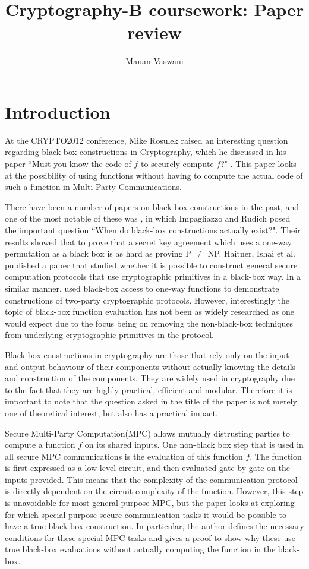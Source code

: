 \documentclass[11pt]{article}
\theoremstyle{theorem}
\theoremstyle{theorem}
\theoremstyle{remark}
\theoremstyle{note}
\theoremstyle{plain}
\theoremstyle{definition}
\begin{document}
\title{Cryptography-B coursework: Paper review}
\author{Manan Vaswani}

\maketitle

\section{Introduction}
At the CRYPTO2012 conference, Mike Rosulek raised an interesting question regarding black-box constructions in Cryptography, which he discussed in his paper ``Must you know the code of $f$ to securely compute $f$?"  \cite{C:Rosulek12a}. This paper looks at the possibility of using functions without having to compute the actual code of such a function in Multi-Party Communications.

There have been a number of papers on black-box constructions in the past, and one of the most notable of these was \cite{STOC:ImpRud89}, in which Impagliazzo and Rudich posed the important question ``When do black-box constructions actually exist?". Their results showed that to prove that a secret key agreement which uses a one-way permutation as a black box is as hard as proving P $\neq$ NP. Haitner, Ishai et al. published a paper \cite{EPRINT:HIKLP10} that studied whether it is possible to construct general secure computation protocols that use cryptographic primitives in a black-box way. In a similar manner, \cite{TCC:PasWee09} used black-box access to one-way functions to demonstrate constructions of two-party cryptographic protocols. However, interestingly the topic of black-box function evaluation has not been as widely researched as one would expect due to the focus being on removing the non-black-box techniques from underlying cryptographic primitives in the protocol. 

Black-box constructions in cryptography are those that rely only on the input and output behaviour of their components without actually knowing the details and construction of the components. They are widely used in cryptography due to the fact that they are highly practical, efficient and modular. Therefore it is important to note that the question asked in the title of the paper is not merely one of theoretical interest, but also has a practical impact.

Secure Multi-Party Computation(MPC) allows mutually distrusting parties to compute a function $f$ on its shared inputs. One non-black box step that is used in all secure MPC communications is the evaluation of this function $f$. The function is first expressed as a low-level circuit, and then evaluated gate by gate on the inputs provided. This means that the complexity of the communication protocol is directly dependent on the circuit complexity of the function. However, this step is unavoidable for most general purpose MPC, but the paper looks at exploring for which special purpose secure communication tasks it would be possible to have a true black box construction.  In particular, the author defines the necessary conditions for these special MPC tasks and gives a proof to show why these use true black-box evaluations without actually computing the function in the black-box.
\end{document}

